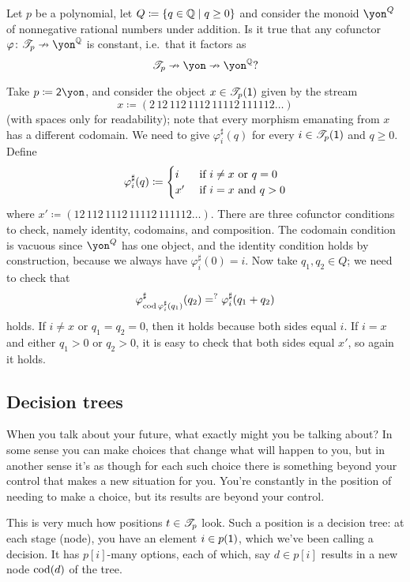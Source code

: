 \documentclass[Book-Poly]{subfiles}
\begin{document}
\begin{exercise}
Let $p$ be a polynomial, let $Q\coloneqq\{q\in\mathbb{Q}\mid q\geq 0\}$ and consider the monoid $\yon^Q$ of nonnegative rational numbers under addition. Is it true that any cofunctor $\varphi\colon\cofree{p}\cof\yon^\qq$ is constant, i.e.\ that it factors as
\[
\cofree{p}\cof\yon\cof\yon^\qq?
\]
\begin{solution}
Take $p\coloneqq\2\yon$, and consider the object $x\in\mathscr{T}_{p}(\textsf{1})$ given by the stream
\[
x\coloneqq(2\,12\,112\,1112\,11112\,111112\ldots)
\]
(with spaces only for readability); note that every morphism emanating from $x$ has a different codomain. We need to give $\varphi^\sharp_i(q)$ for every $i\in\mathscr{T}_{p}(\textsf{1})$ and $q\geq 0$. Define
\[
	\varphi^\sharp_i(q)\coloneqq
	\begin{cases}
		i&\textnormal{ if }i\neq x \textnormal{ or } q=0\\
		x'&\textnormal{ if }i=x\textnormal{ and } q>0
	\end{cases}
\]
where $x'\coloneqq(12\,112\,1112\,11112\,111112\ldots)$. There are three cofunctor conditions to check, namely identity, codomains, and composition. The codomain condition is vacuous since $\yon^Q$ has one object, and the identity condition holds by construction, because we always have $\varphi^\sharp_i(0)=i$. Now take $q_1,q_2\in Q$; we need to check that
\[\varphi^\sharp_{\operatorname{cod}\varphi^\sharp_i(q_1)}(q_2)=^?\varphi^\sharp_i(q_1+q_2)\]
holds. If $i\neq x$ or $q_1=q_2=0$, then it holds because both sides equal $i$. If $i=x$ and either $q_1>0$ or $q_2>0$, it is easy to check that both sides equal $x'$, so again it holds.
\end{solution}
\end{exercise}

\subsection{Decision trees}

When you talk about your future, what exactly might you be talking about? In some sense you can make choices that change what will happen to you, but in another sense it's as though for each such choice there is something beyond your control that makes a new situation for you. You're constantly in the position of needing to make a choice, but its results are beyond your control.

This is very much how positions $t\in\mathscr{T}_{p}$ look. Such a position is a decision tree: at each stage (node), you have an element $i\in p(\textsf{1})$, which we've been calling a decision. It has $p[i]$-many options, each of which, say $d\in p[i]$ results in a new node $\operatorname{cod}(d)$ of the tree.
\end{document}
